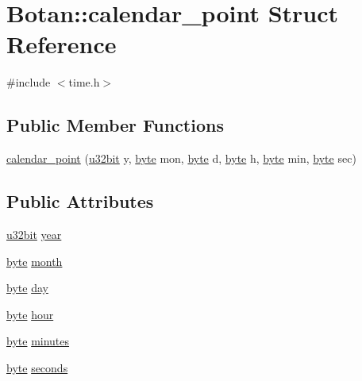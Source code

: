 \hypertarget{structBotan_1_1calendar__point}{\section{Botan\-:\-:calendar\-\_\-point Struct Reference}
\label{structBotan_1_1calendar__point}
}


{\ttfamily \#include $<$time.\-h$>$}

\subsection*{Public Member Functions}
\begin{DoxyCompactItemize}
\item 
\hyperlink{structBotan_1_1calendar__point_ad07023f34d485d6604f0eb165d95c560}{calendar\-\_\-point} (\hyperlink{namespaceBotan_aacc7d03c95e97e76168fc1c819031830}{u32bit} y, \hyperlink{namespaceBotan_a7d793989d801281df48c6b19616b8b84}{byte} mon, \hyperlink{namespaceBotan_a7d793989d801281df48c6b19616b8b84}{byte} d, \hyperlink{namespaceBotan_a7d793989d801281df48c6b19616b8b84}{byte} h, \hyperlink{namespaceBotan_a7d793989d801281df48c6b19616b8b84}{byte} min, \hyperlink{namespaceBotan_a7d793989d801281df48c6b19616b8b84}{byte} sec)
\end{DoxyCompactItemize}
\subsection*{Public Attributes}
\begin{DoxyCompactItemize}
\item 
\hyperlink{namespaceBotan_aacc7d03c95e97e76168fc1c819031830}{u32bit} \hyperlink{structBotan_1_1calendar__point_a76a738149369b76116d30eebf2ca0fec}{year}
\item 
\hyperlink{namespaceBotan_a7d793989d801281df48c6b19616b8b84}{byte} \hyperlink{structBotan_1_1calendar__point_a8c95b2bb64c9ca1b7782d464c88a3c67}{month}
\item 
\hyperlink{namespaceBotan_a7d793989d801281df48c6b19616b8b84}{byte} \hyperlink{structBotan_1_1calendar__point_afa98f14c13f0795ab64f6264759b3939}{day}
\item 
\hyperlink{namespaceBotan_a7d793989d801281df48c6b19616b8b84}{byte} \hyperlink{structBotan_1_1calendar__point_afbbacded732cbe93ef9b5a9140ff980d}{hour}
\item 
\hyperlink{namespaceBotan_a7d793989d801281df48c6b19616b8b84}{byte} \hyperlink{structBotan_1_1calendar__point_a1288746b8c0073443cbfdbc0e73e98d4}{minutes}
\item 
\hyperlink{namespaceBotan_a7d793989d801281df48c6b19616b8b84}{byte} \hyperlink{structBotan_1_1calendar__point_a5977fb8032381d23e1eab589c72e3d22}{seconds}
\end{DoxyCompactItemize}


